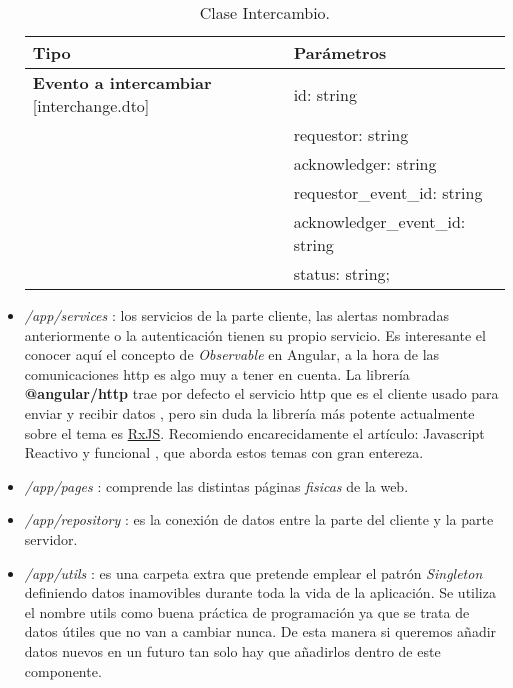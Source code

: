 \begin{itemize}
\begin{table}[H]
\centering
\begin{tabular}{|l|l|}
\hline
Tipo  & Parámetros  \\
\hline \hline
\textbf{Evento a intercambiar} [interchange.dto] & id: string \\ 
  & requestor: string \\ 
  & acknowledger: string \\ 
  & requestor\_event\_id: string \\ 
  & acknowledger\_event\_id: string \\ 
  & status: string;  \\ \hline
\end{tabular}
\caption{Clase Intercambio.}
\label{tabla:sencilla2}
\end{table}


	
	
	\item \emph{/app/services} : los servicios de la parte cliente, las alertas nombradas anteriormente o la autenticación tienen su propio servicio. Es interesante el conocer aquí el concepto de \emph{Observable} \cite{ob1} en Angular, a la hora de las comunicaciones http es algo muy a tener en cuenta. La librería \textbf{@angular/http} trae por defecto el servicio http que es el cliente usado para enviar y recibir datos \cite{ob2}, pero sin duda la librería más potente actualmente sobre el tema es \href{http://reactivex.io/rxjs/}{RxJS}. Recomiendo encarecidamente el artículo: Javascript Reactivo y funcional \cite{ob3}, que aborda estos temas con gran entereza.
	
	\item \emph{/app/pages} : comprende las distintas páginas \emph{fisicas} de la web.
	
	\item \emph{/app/repository} : es la conexión de datos entre la parte del cliente y la parte servidor.
	
	
	\item \emph{/app/utils} : es una carpeta extra que pretende emplear el patrón \emph{Singleton} definiendo datos inamovibles durante toda la vida de la aplicación. Se utiliza el nombre utils como buena práctica de programación ya que se trata de datos útiles que no van a cambiar nunca. De esta manera si queremos añadir datos nuevos en un futuro tan solo hay que añadirlos dentro de este componente. 
	

\end{itemize}
